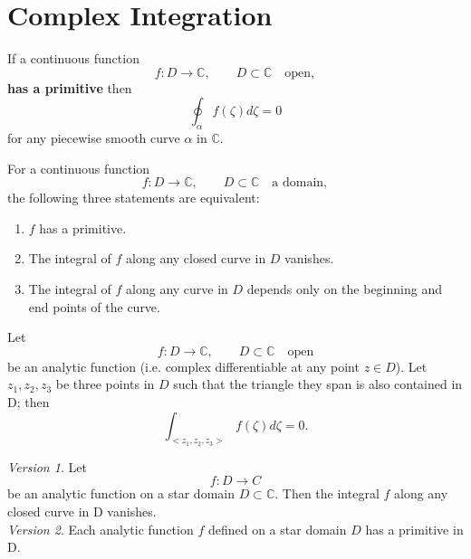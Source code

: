\section{Complex Integration}


\begin{theorem}
    \label{sec:ClosedContourT}
    If a continuous function
    $$ f : D \rightarrow \mathbb{C}, \qquad D \subset \mathbb{C} \quad \text{open},$$
    \textbf{has a primitive} then
    $$\oint_\alpha f(\zeta)d\zeta = 0$$
    for any piecewise smooth curve $\alpha$ in $\mathbb{C}$.
\end{theorem}


\begin{theorem}
    \label{sec:MainTCalculus}
    For a continuous function
    $$ f : D \rightarrow \mathbb{C}, \qquad D \subset \mathbb{C} \quad \text{a domain},$$
    the following three statements are equivalent:
    \begin{enumerate}[label=\alph*)]
        \item $f$ has a primitive.
        \item The integral of $f$ along any closed curve in $D$ vanishes.
        \item The integral of $f$ along any curve in $D$ depends only on the beginning and end points of the curve.
    \end{enumerate}
\end{theorem}


\begin{theorem}
    \label{sec:CauchyITT}
    Let
    $$ f : D \rightarrow \mathbb{C}, \qquad D \subset \mathbb{C} \quad \text{open}$$
    be an analytic function (i.e. complex differentiable at any point $z \in D$). Let $z_1, z_2, z_3$ be three points
    in $D$ such that the triangle they span is also contained in D; then
    $$\int_{<z_1,z_2,z_3>} f(\zeta)d\zeta = 0.$$
\end{theorem}


\begin{theorem}
    \label{sec:CauchyITR}
    \textit{Version 1}. Let
    $$f : D \rightarrow C$$
    be an analytic function on a star domain $D \subset \mathbb{C}$. Then the integral $f$ along
    any closed curve in D vanishes.\\
    \textit{Version 2}. Each analytic function $f$ defined on a star domain $D$ has a primitive in D.
\end{theorem}


